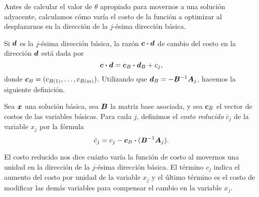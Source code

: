 Antes de calcular el valor de $\theta$ apropiado para movernos a una solución adyacente, calculamos cómo varía el costo de la función a optimizar al desplazarnos en la dirección de la $j$-ésima dirección básica.

Si $\bm{d}$ es la $j$-ésima dirección básica, la razón $\bm{c} \boldsymbol{\cdot} \bm{d}$ de cambio del costo en la dirección $\bm{d}$ está dada por
$$
\bm{c} \boldsymbol{\cdot} \bm{d} = \bm{c}_B \boldsymbol{\cdot} \bm{d}_B + c_j,
$$
donde $\bm{c}_B = (c_{B(1)}, \dots, c_{B(m)})$. Utilizando que $\bm{d}_B = -\bm{B}^{-1}\bm{A}_{j}$, hacemos la siguiente definición.

\begin{definition}
Sea $\bm{x}$ una solución básica, sea $\bm{B}$ la matriz base asociada, y sea $\bm{c}_B$ el vector de costos de las variables básicas. Para cada $j$, definimos el \emph{costo reducido} $\bar c_j$ de la variable $x_j$ por la fórmula
$$
\bar c_j = c_j - \bm{c}_B \boldsymbol{\cdot} (\bm{B}^{-1}\bm{A}_{j}).
$$
\end{definition}

El costo reducido nos dice cuánto varía la función de costo al movernos una unidad en la dirección de la $j$-ésima dirección básica. El término $c_j$ indica el aumento del costo por unidad de la variable $x_j$ y el último término es el costo de modificar las demás variables para compensar el cambio en la variable $x_j$.


